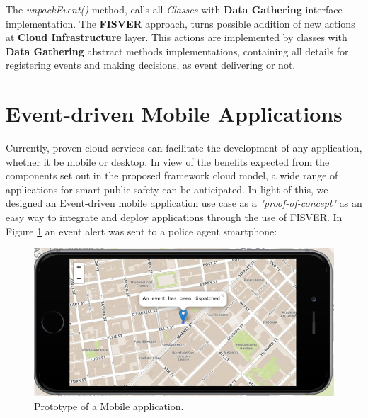 The \textit{unpackEvent()} method, calls all \textit{Classes} with \textbf{Data Gathering} interface implementation. The \textbf{FISVER} approach, turns possible addition of new actions at \textbf{Cloud Infrastructure} layer. This actions are implemented by classes with \textbf{Data Gathering} abstract methods implementations, containing all details for registering events and making decisions, as event delivering or not.




\section{Event-driven Mobile Applications}
%
%
%
Currently, proven cloud services can facilitate the development of any application, whether it be mobile or desktop. In view of the benefits expected from the components set out in the proposed framework cloud model, a wide range of applications for smart public safety can be anticipated. In light of this, we designed an Event-driven mobile application use case as a \textit{"proof-of-concept"} as an easy way to integrate and deploy applications through the use of FISVER. In Figure \ref{fig:app} an event alert was sent to a police agent smartphone:


\begin{figure}[htb]
 	\centering
 	\includegraphics[scale=0.50]{Imagens/cap4_app.png}
 	\caption{Prototype of a Mobile application.}
 	\label{fig:app}
\end{figure}


